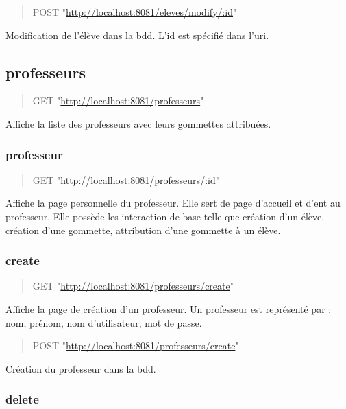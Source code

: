 \documentclass[11pt]{article}
\begin{document}
\begin{quote}
POST "\url{http://localhost:8081/eleves/modify/:id}"
\end{quote}

Modification de l'élève dans la bdd. L'id est spécifié dans l'uri.

\subsection{professeurs}
\label{sec:org6a8910c}

\begin{quote}
GET "\url{http://localhost:8081/professeurs}"
\end{quote}

Affiche la liste des professeurs avec leurs gommettes attribuées.

\subsubsection{professeur}
\label{sec:org455ecbc}

\begin{quote}
GET "\url{http://localhost:8081/professeurs/:id}"
\end{quote}

Affiche la page personnelle du professeur. Elle sert de page d'accueil
et d'ent au professeur. Elle possède les interaction de base telle que
création d'un élève, création d'une gommette, attribution d'une gommette
à un élève.

\subsubsection{create}
\label{sec:org34e950e}

\begin{quote}
GET "\url{http://localhost:8081/professeurs/create}"
\end{quote}

Affiche la page de création d'un professeur. Un professeur est représenté
par : nom, prénom, nom d'utilisateur, mot de passe.

\begin{quote}
POST "\url{http://localhost:8081/professeurs/create}"
\end{quote}

Création du professeur dans la bdd.

\subsubsection{delete}
\label{sec:org858a016}
\end{document}
